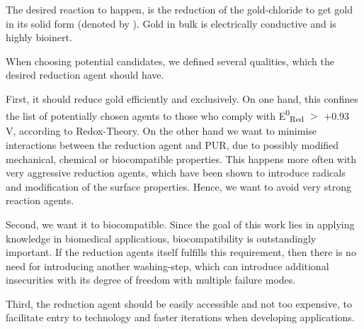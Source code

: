 The desired reaction to happen, is the reduction of the gold-chloride to get gold in its solid form (denoted by ). Gold in bulk is electrically conductive and is highly bioinert.

When choosing potential candidates, we defined several qualities, which the desired reduction agent should have.

First, it should reduce gold efficiently and exclusively. On one hand, this confines the list of potentially chosen agents to those who comply with E\textsuperscript{0}\textsubscript{Red} $\mathrm{>}$ +0.93 V, according to Redox-Theory. On the other hand we want to minimise interactions between the reduction agent and PUR, due to possibly modified mechanical, chemical or biocompatible properties. This happens more often with very aggressive reduction agents, which have been shown to introduce radicals and modification of the surface properties. Hence, we want to avoid very strong reaction agents. 

Second, we want it to biocompatible. Since the goal of this work lies in applying knowledge in biomedical applications, biocompatibility is outstandingly important. If the reduction agents itself fulfills this requirement, then there is no need for introducing another washing-step, which can introduce additional insecurities with its degree of freedom with multiple failure modes.


Third, the reduction agent should be easily accessible and not too expensive, to facilitate entry to technology and faster iterations when developing applications.


